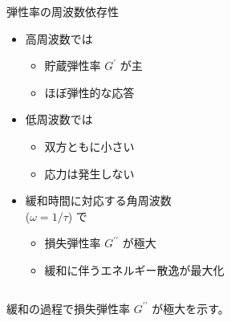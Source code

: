 \documentclass[12pt, dvipdfmx]{beamer}
\begin{document}
\begin{frame}
\begin{columns}[c, onlytextwidth]
				\begin{alertblock}{弾性率の周波数依存性}
					\begin{itemize}
						\item 高周波数では
						\begin{itemize}
							\item 貯蔵弾性率 $G^{\prime}$ が主
							\item ほぼ弾性的な応答
						\end{itemize}
						\item 低周波数では
						\begin{itemize}
							\item 双方ともに小さい
							\item 応力は発生しない
						\end{itemize}
						\item 緩和時間に対応する角周波数\\($\omega=1/\tau$) で
						\begin{itemize}
							\item 損失弾性率 $G^{\prime\prime}$ が極大
							\item 緩和に伴うエネルギー散逸が最大化
						\end{itemize}
					\end{itemize}
				\end{alertblock}
		\end{columns}

		\vspace{3mm}
		\large
		\centering
		\alert{緩和の過程で損失弾性率 $G^{\prime\prime}$ が極大を示す。}
\end{frame}
\end{document}
